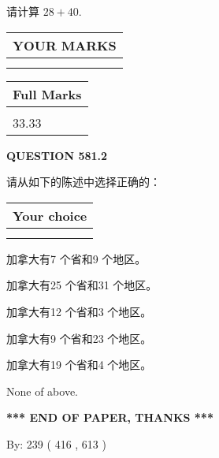 \documentclass{ctexart}
\begin{document}
  
 
请计算 $ %
28 +  %
40 $.
 

 

 
  
\vspace{0.2in}
  
\noindent\begin{tabular}{|l|}
\hline
 YOUR MARKS  \\
\hline
 \\ 
 \\ 
\hline
\end{tabular}
\hspace{0.05in} \begin{tabular}{|l|}
\hline
 Full Marks  \\
\hline
 \\ 
33.33 \\
\hline
\end{tabular}
{\textbf{\Large{QUESTION
581.2 
}}}
  
  
请从如下的陈述中选择正确的：
  
  
\noindent\hspace{3.0in} \begin{tabular}{|l|}
\hline
Your choice \\
\hline
 \\ 
 \\ 
\hline
\end{tabular}
  
  
 
 
加拿大有7 个省和9 个地区。
 
 
加拿大有25 个省和31 个地区。
 
 
加拿大有12 个省和3 个地区。
 
 
加拿大有9 个省和23 个地区。
 
 
加拿大有19 个省和4 个地区。
 
 
 None of above.
 
 
   
   
 \vspace{0.2in}
 
   
   
   
   
\vspace{1.0in} 
{\textbf{\large{ *** END OF PAPER, THANKS *** }}} 
   
   
\hspace{1.0in} By: 
 239 ( 416 ,  613 )
   
\end{document}
